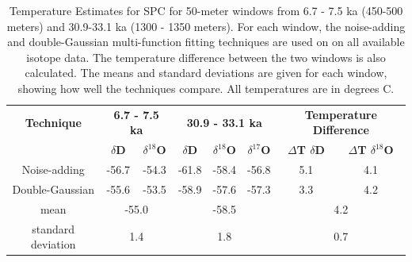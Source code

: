 \documentclass[draft, jgrga]{AGUTeX}
\begin{document}
\begin{table}
\caption{Temperature Estimates for SPC for 50-meter windows from 6.7 - 7.5 ka (450-500 meters) and 30.9-33.1 ka (1300 - 1350 meters). For each window, the noise-adding and double-Gaussian multi-function fitting techniques are used on on all available isotope data. The temperature difference between the two windows is also calculated. The means and standard deviations are given for each window, showing how well the techniques compare. All temperatures are in degrees C.}\label{SP_deltaT}
\begin{tabular}{c|c c|c c c|c c}
\textbf{Technique} & \multicolumn{2}{|c|}{\textbf{6.7 - 7.5 ka}} & \multicolumn{3}{|c|}{\textbf{30.9 - 33.1 ka}} & \multicolumn{2}{|c}{\textbf{Temperature Difference}}\\
 & \textbf{$\delta$D} & \textbf{$\delta^{18}$O} & \textbf{$\delta$D} & \textbf{$\delta^{18}$O} & \textbf{$\delta^{17}$O} & \textbf{$\Delta$T $\delta$D} & \textbf{$\Delta$T $\delta^{18}$O}\\
\hline
Noise-adding & -56.7 & -54.3 & -61.8 & -58.4 & -56.8 & 5.1 & 4.1 \\
Double-Gaussian & -55.6 & -53.5 & -58.9 & -57.6 & -57.3 & 3.3 & 4.2 \\
\hline
mean & \multicolumn{2}{|c|}{-55.0} & \multicolumn{3}{|c|}{-58.5} & \multicolumn{2}{|c}{4.2} \\
standard deviation & \multicolumn{2}{|c|}{1.4} & \multicolumn{3}{|c|}{1.8} & \multicolumn{2}{|c}{0.7} \\
\end{tabular}
\end{table}
\end{document}
